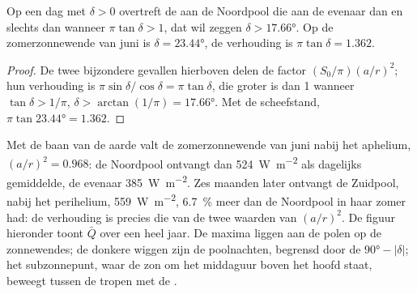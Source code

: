\begin{proposition}[De poolzomer]\label{prop:b1:radiation-heat-transport:polar-summer}
Op een dag met  $\delta > 0$ overtreft de  aan de Noordpool die aan de evenaar dan en slechts dan wanneer $\pi\tan\delta > 1$, dat wil zeggen $\delta >
\ang{17.66}$. Op de zomerzonnewende van juni is $\delta = \ang{23.44}$, de verhouding is $\pi\tan
\delta = 1.362$.
\end{proposition}

\begin{proof}
De twee bijzondere gevallen hierboven delen de factor $(S_0/\pi)(a/r)^2$; hun verhouding is $\pi\sin\delta/\cos\delta = \pi\tan\delta$, die groter is dan 1 wanneer $\tan\delta >
1/\pi$, $\delta > \arctan(1/\pi) = \ang{17.66}$. Met de scheefstand, $\pi\tan\ang{23.44} = 1.362$.
\end{proof}

Met de baan van de aarde valt de zomerzonnewende van juni nabij het aphelium, $(a/r)^2 = 0.968$: de Noordpool ontvangt dan \qty{524}{W.m^{-2}} als dagelijks gemiddelde, de evenaar \qty{385}{W.m^{-2}}. Zes maanden later ontvangt de Zuidpool, nabij het perihelium, \qty{559}{W.m^{-2}}, \qty{6.7}{\percent} meer dan de Noordpool in haar zomer had: de verhouding is precies die van de twee waarden van $(a/r)^2$. De figuur hieronder toont $\bar Q$ over een heel jaar. De maxima liggen aan de polen op de zonnewendes; de donkere wiggen zijn de poolnachten, begrensd door de  $\ang{90} -
|\delta|$; het subzonnepunt, waar de zon om het middaguur boven het hoofd staat, beweegt tussen de tropen met de .

